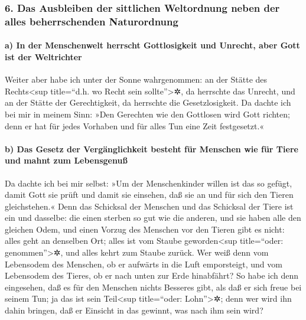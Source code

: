 \hypertarget{das-ausbleiben-der-sittlichen-weltordnung-neben-der-alles-beherrschenden-naturordnung}{%
\subsubsection{6. Das Ausbleiben der sittlichen Weltordnung neben der
alles beherrschenden
Naturordnung}\label{das-ausbleiben-der-sittlichen-weltordnung-neben-der-alles-beherrschenden-naturordnung}}

\hypertarget{a-in-der-menschenwelt-herrscht-gottlosigkeit-und-unrecht-aber-gott-ist-der-weltrichter}{%
\paragraph{a) In der Menschenwelt herrscht Gottlosigkeit und Unrecht,
aber Gott ist der
Weltrichter}\label{a-in-der-menschenwelt-herrscht-gottlosigkeit-und-unrecht-aber-gott-ist-der-weltrichter}}

Weiter aber habe ich unter der Sonne wahrgenommen: an der
Stätte des Rechts\textless sup title=``d.h. wo Recht sein
sollte''\textgreater✲, da herrschte das Unrecht, und an der Stätte der
Gerechtigkeit, da herrschte die Gesetzlosigkeit. Da
dachte ich bei mir in meinem Sinn: »Den Gerechten wie den Gottlosen wird
Gott richten; denn er hat für jedes Vorhaben und für alles Tun eine Zeit
festgesetzt.«

\hypertarget{b-das-gesetz-der-verguxe4nglichkeit-besteht-fuxfcr-menschen-wie-fuxfcr-tiere-und-mahnt-zum-lebensgenuuxdf}{%
\paragraph{b) Das Gesetz der Vergänglichkeit besteht für Menschen wie
für Tiere und mahnt zum
Lebensgenuß}\label{b-das-gesetz-der-verguxe4nglichkeit-besteht-fuxfcr-menschen-wie-fuxfcr-tiere-und-mahnt-zum-lebensgenuuxdf}}

Da dachte ich bei mir selbst: »Um der Menschenkinder
willen ist das so gefügt, damit Gott sie prüft und damit sie einsehen,
daß sie an und für sich den Tieren gleichstehen.« Denn
das Schicksal der Menschen und das Schicksal der Tiere ist ein und
dasselbe: die einen sterben so gut wie die anderen, und sie haben alle
den gleichen Odem, und einen Vorzug des Menschen vor den Tieren gibt es
nicht: alles geht an denselben Ort; alles ist vom Staube
geworden\textless sup title=``oder: genommen''\textgreater✲, und alles
kehrt zum Staube zurück. Wer weiß denn vom Lebensodem des
Menschen, ob er aufwärts in die Luft emporsteigt, und vom Lebensodem des
Tieres, ob er nach unten zur Erde hinabfährt? So habe ich
denn eingesehen, daß es für den Menschen nichts Besseres gibt, als daß
er sich freue bei seinem Tun; ja das ist sein Teil\textless sup
title=``oder: Lohn''\textgreater✲; denn wer wird ihn dahin bringen, daß
er Einsicht in das gewinnt, was nach ihm sein wird?

